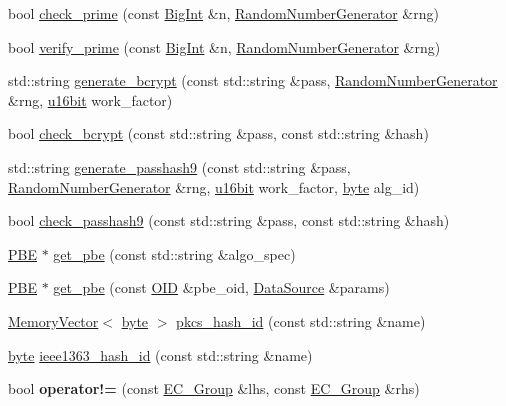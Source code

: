 \begin{DoxyCompactItemize}
\item 
bool \hyperlink{namespaceBotan_af6f2e869065b1860fa41959f72ce6dd8}{check\-\_\-prime} (const \hyperlink{classBotan_1_1BigInt}{Big\-Int} \&n, \hyperlink{classBotan_1_1RandomNumberGenerator}{Random\-Number\-Generator} \&rng)
\item 
bool \hyperlink{namespaceBotan_aaafcd26fc5a710d6c4656e1201d4d1be}{verify\-\_\-prime} (const \hyperlink{classBotan_1_1BigInt}{Big\-Int} \&n, \hyperlink{classBotan_1_1RandomNumberGenerator}{Random\-Number\-Generator} \&rng)
\item 
std\-::string \hyperlink{namespaceBotan_a2cfff27fc2bcb01643e4f39225c8390e}{generate\-\_\-bcrypt} (const std\-::string \&pass, \hyperlink{classBotan_1_1RandomNumberGenerator}{Random\-Number\-Generator} \&rng, \hyperlink{namespaceBotan_ab07face63a00c39ea6ed97f203ee501c}{u16bit} work\-\_\-factor)
\item 
bool \hyperlink{namespaceBotan_af1e03fa195c8c4e7f526e12b741d386b}{check\-\_\-bcrypt} (const std\-::string \&pass, const std\-::string \&hash)
\item 
std\-::string \hyperlink{namespaceBotan_ab5f6938121ccdc152527884fdc30c789}{generate\-\_\-passhash9} (const std\-::string \&pass, \hyperlink{classBotan_1_1RandomNumberGenerator}{Random\-Number\-Generator} \&rng, \hyperlink{namespaceBotan_ab07face63a00c39ea6ed97f203ee501c}{u16bit} work\-\_\-factor, \hyperlink{namespaceBotan_a7d793989d801281df48c6b19616b8b84}{byte} alg\-\_\-id)
\item 
bool \hyperlink{namespaceBotan_a9bcf346d8a6d8da85b729cc0912ac03e}{check\-\_\-passhash9} (const std\-::string \&pass, const std\-::string \&hash)
\item 
\hyperlink{classBotan_1_1PBE}{P\-B\-E} $\ast$ \hyperlink{namespaceBotan_ae4073cd642d6d3c4efb8b9f39fab853b}{get\-\_\-pbe} (const std\-::string \&algo\-\_\-spec)
\item 
\hyperlink{classBotan_1_1PBE}{P\-B\-E} $\ast$ \hyperlink{namespaceBotan_af77adc16b6c9cda38c4f3ca608aaa12f}{get\-\_\-pbe} (const \hyperlink{classBotan_1_1OID}{O\-I\-D} \&pbe\-\_\-oid, \hyperlink{classBotan_1_1DataSource}{Data\-Source} \&params)
\item 
\hyperlink{classBotan_1_1MemoryVector}{Memory\-Vector}$<$ \hyperlink{namespaceBotan_a7d793989d801281df48c6b19616b8b84}{byte} $>$ \hyperlink{namespaceBotan_a8ab4bde9aec032722039dad0eb15aa9c}{pkcs\-\_\-hash\-\_\-id} (const std\-::string \&name)
\item 
\hyperlink{namespaceBotan_a7d793989d801281df48c6b19616b8b84}{byte} \hyperlink{namespaceBotan_af310dd85fe09996b155bd258d11f601b}{ieee1363\-\_\-hash\-\_\-id} (const std\-::string \&name)
\item 
\hypertarget{namespaceBotan_a4d0a0af0ddf73a8188e0773592b994db}{bool {\bfseries operator!=} (const \hyperlink{classBotan_1_1EC__Group}{E\-C\-\_\-\-Group} \&lhs, const \hyperlink{classBotan_1_1EC__Group}{E\-C\-\_\-\-Group} \&rhs)}\label{namespaceBotan_a4d0a0af0ddf73a8188e0773592b994db}


\end{DoxyCompactItemize}
